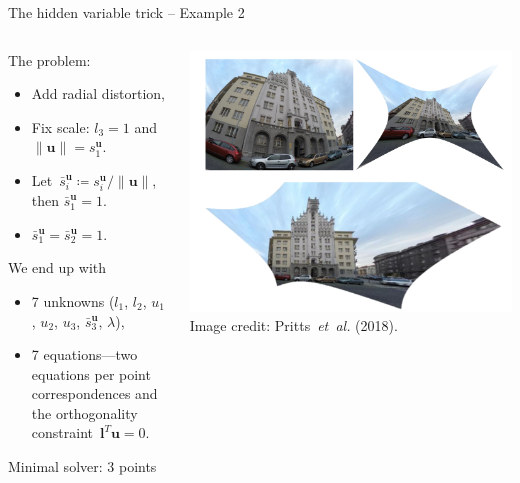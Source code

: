\documentclass[aspectratio=169]{beamer}
\makeatletter
\newcommand{\etal}{\emph{et~al.}}
\newcommand{\mat}[1]{\bm{#1}}
\newcommand{\norm}[1]{\|#1\|}
\newcommand{\T}{T}
\DeclareRobustCommand\etal{\emph{et~al}\@ifnextchar.{}{.\@}}
\makeatother
\begin{document}
\begin{frame}[t]{The hidden variable trick -- Example 2}
\begin{columns}
    \begin{column}{0.5\textwidth}
        \begin{minipage}[t][\textheight][t]{\textwidth}
        \hiddenvariableTwoeHeight
        The problem:
        \begin{itemize}
            \item Add radial distortion,
            \item Fix scale: $l_3=1$ and $\norm{\mat{u}}=s_1^{\mat{u}}$.
            \item Let~$\bar{s}_i^{\mat{u}}\coloneqq s_i^{\mat{u}} / \norm{\mat{u}}$, then $\bar{s}_1^{\mat{u}}=1$.
            \item $\bar{s}_1^{\mat{u}} = \bar{s}_2^{\mat{u}} = 1$.
        \end{itemize}
We end up with
        \begin{itemize}
            \item 7 unknowns ($l_1$, $l_2$, $u_1$, $u_2$, $u_3$, $\bar{s}_3^{\mat{u}}$, $\lambda$),
            \item 7 equations---two equations
per point correspondences and the orthogonality constraint~$\mat{l}^\T\mat{u}= 0$.
        \end{itemize}
        Minimal solver: 3 points
        \end{minipage}
    \end{column}%
    \begin{column}{0.5\textwidth}
        \centering
        \includegraphics[width=\linewidth]{images/conjugate_trans.png}
        {\scriptsize Image credit: Pritts~\etal{} (2018).}
    \end{column}
\end{columns}
\end{frame}
\end{document}
